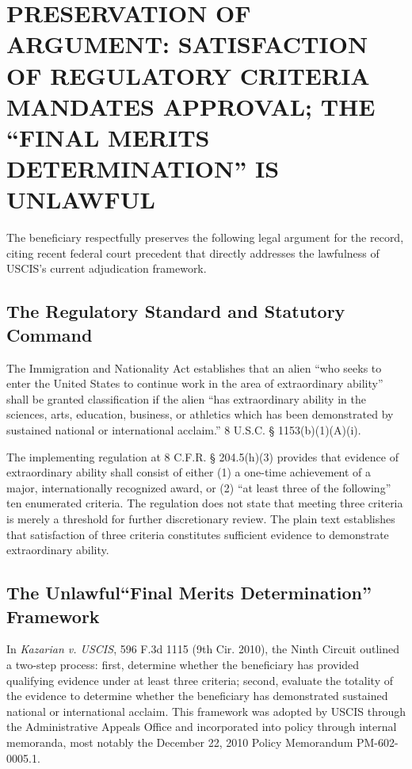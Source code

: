 \section{PRESERVATION OF ARGUMENT: SATISFACTION OF REGULATORY CRITERIA MANDATES APPROVAL; THE ``FINAL MERITS DETERMINATION'' IS UNLAWFUL}
\label{sec:mukherji}

The beneficiary respectfully preserves the following legal argument for the record, citing recent federal court precedent that directly addresses the lawfulness of USCIS's current adjudication framework.

\subsection{The Regulatory Standard and Statutory Command}

The Immigration and Nationality Act establishes that an alien ``who seeks to enter the United States to continue work in the area of extraordinary ability'' shall be granted classification if the alien ``has extraordinary ability in the sciences, arts, education, business, or athletics which has been demonstrated by sustained national or international acclaim.'' 8 U.S.C. § 1153(b)(1)(A)(i).

The implementing regulation at 8 C.F.R. § 204.5(h)(3) provides that evidence of extraordinary ability shall consist of either (1) a one-time achievement of a major, internationally recognized award, or (2) ``at least three of the following'' ten enumerated criteria. The regulation does not state that meeting three criteria is merely a threshold for further discretionary review. The plain text establishes that satisfaction of three criteria constitutes sufficient evidence to demonstrate extraordinary ability.

\subsection{The Unlawful``Final Merits Determination'' Framework}

In \textit{Kazarian v. USCIS}, 596 F.3d 1115 (9th Cir. 2010), the Ninth Circuit outlined a two-step process: first, determine whether the beneficiary has provided qualifying evidence under at least three criteria; second, evaluate the totality of the evidence to determine whether the beneficiary has demonstrated sustained national or international acclaim. This framework was adopted by USCIS through the Administrative Appeals Office and incorporated into policy through internal memoranda, most notably the December 22, 2010 Policy Memorandum PM-602-0005.1.

